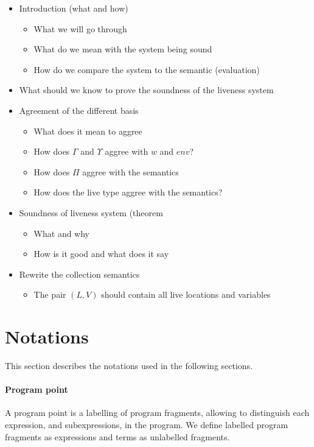 \documentclass[../../master.tex]{subfiles}
\begin{document}
\begin{itemize}
	\item Introduction (what and how)
	\begin{itemize}
		\item What we will go through
		\item What do we mean with the system being sound
		\item How do we compare the system to the semantic (evaluation)
	\end{itemize}
	\item What should we know to prove the soundness of the liveness system
	\item Agreement of the different basis
	\begin{itemize}
		\item What does it mean to aggree
		\item How does $\Gamma$ and $\Upsilon$ aggree with $w$ and $env$?
		\item How does $\Pi$ aggree with the semantics
		\item How does the live type aggree with the semantics?
	\end{itemize}
	\item Soundness of liveness system (theorem
	\begin{itemize}
		\item What and why
		\item How is it good and what does it say
	\end{itemize}
	\item Rewrite the collection semantics
	\begin{itemize}
		\item The pair $(L,V)$ should contain all live locations and variables
	\end{itemize}
\end{itemize}

\section{Notations}
This section describes the notations used in the following sections.

\paragraph{Program point}
A program point is a labelling of program fragments, allowing to distinguish each expression, and subexpressions, in the program.
We define labelled program fragments as expressions and terms as unlabelled fragments.
\end{document}
